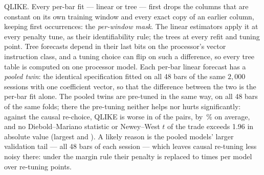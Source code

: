 QLIKE. Every per-bar fit --- linear or
tree --- first drops the columns
that are constant on its own training window and every exact copy of an earlier
column, keeping first occurrences: the \emph{per-window mask}. The linear
estimators apply it at every penalty tune, as their identifiability rule; the
trees at every refit and tuning point. Tree forecasts depend
in their last bits on the processor's vector instruction class, and a tuning
choice can flip on such a difference, so every tree table is computed
on one processor model. Each per-bar linear forecast has
a \emph{pooled twin}: the identical specification fitted on all 48 bars of the same
$2{,}000$ sessions with one coefficient vector, so that the difference between the
two is the per-bar fit alone. The pooled twins are pre-tuned in the same way, on all 48 bars %
of the same folds; there the pre-tuning neither helps nor hurts significantly: against the
causal re-choice, QLIKE is worse in \cmPoolPtQWorse{} of the \cmPoolPtN{} pairs, by
\cmPoolPtQPctMean\,\% on average, and no Diebold--Mariano statistic or Newey--West $t$ of the
trade exceeds 1.96 in absolute value (largest \cmPoolPtDMMax{} and \cmPoolPtTMax).
A likely reason is the pooled models' larger validation tail --- all 48 bars of each
session --- which leaves causal re-tuning less noisy there: under the margin rule their
penalty is replaced \cmPoolPtRetuneSwMin{} to \cmPoolPtRetuneSwMax{} times per model over
\cmPoolPtRetunes{} re-tuning points.


